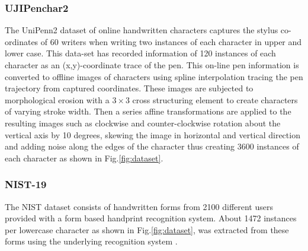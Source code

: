 \documentclass[runningheads]{llncs}
\begin{document}
\subsubsection{UJIPenchar2}
The UniPenn2 dataset of online handwritten characters \cite{UJIPen} captures the stylus co-ordinates of 60 writers when writing two instances of each character in upper and lower case. This data-set has recorded information of 120 instances of each character as an (x,y)-coordinate trace of the pen. This on-line pen information is converted to offline images of characters using spline interpolation tracing the pen trajectory from captured coordinates. These images are subjected to  morphological erosion with a $3\times3$ cross structuring element to create characters of varying stroke width. Then a series affine transformations are applied to the resulting images such as clockwise and counter-clockwise rotation about the vertical axis by 10 degrees, skewing the image in horizontal and vertical direction and adding noise along the edges of the character thus creating 3600 instances of each character as shown in Fig.\ref{fig:dataset}.

\subsubsection{NIST-19}
The NIST dataset consists of handwritten forms from 2100 different users provided with a form based handprint recognition system. About 1472 instances per lowercase character as shown in Fig.\ref{fig:dataset}, was extracted from these forms using the underlying recognition system \cite{NIST19}.

\end{document}
